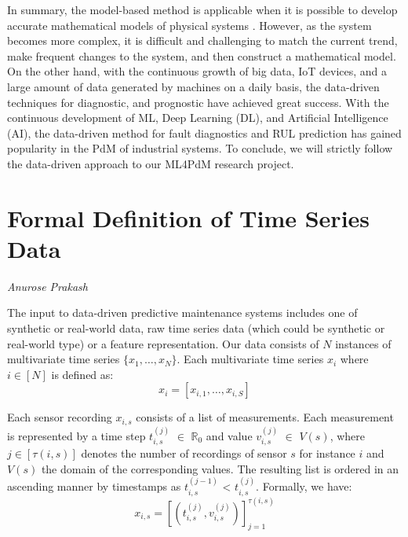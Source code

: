 In summary, the model-based method is applicable when it is possible to develop accurate mathematical models of physical systems \cite{DBLP:journals/corr/abs-1912-07383}. However, as the system becomes more complex, it is difficult and challenging to match the current trend, make frequent changes to the system, and then construct a mathematical model. On the other hand, with the continuous growth of big data, IoT devices, and a large amount of data generated by machines on a daily basis, the data-driven techniques for diagnostic, and prognostic have achieved great success. With the continuous development of ML, Deep Learning (DL), and Artificial Intelligence (AI), the data-driven method for fault diagnostics and RUL prediction has gained popularity in the PdM of industrial systems. To conclude, we will strictly follow the data-driven approach to our ML4PdM research project.

\section{Formal Definition of Time Series Data}
\vspace*{-3mm}\hfill{\normalsize\emph{Anurose Prakash}}
\label{sec:intro:time-series-definition}

The input to data-driven predictive maintenance systems includes one of synthetic or real-world data, raw time series data (which could be synthetic  or real-world type) or a feature representation. Our data consists of $N$ instances of multivariate time series $\{x_1, \dots, x_N \}$. Each multivariate time series $x_i$ where $i \in [N]$ is defined as:
\begin{equation}
  x_i = [x_{i,1},\dots, x_{i,S}]
\end{equation}

Each sensor recording $x_{i,s}$ consists of a list of measurements. Each measurement is represented by a time step ${t_{i,s}^{(j)}}$  $\in$ $\mathbb{R}_{0}$ and value ${v_{i,s}^{(j)}}$ $\in$ $V(s)$, where $j \in [\tau(i,s)]$ denotes the number of recordings of sensor $s$ for instance $i$ and $V(s)$ the domain of the corresponding values. The resulting list is ordered in an ascending manner by timestamps as ${t_{i,s}^{(j-1)}}$ < ${t_{i,s}^{(j)}}$. Formally, we have:
\begin{equation}
  {x_{i,s}}= \left [ \left (t_{i,s}^{(j)},v_{i,s}^{(j)}\right) \right ]_{j=1}^{\tau (i,s)}
\end{equation}

